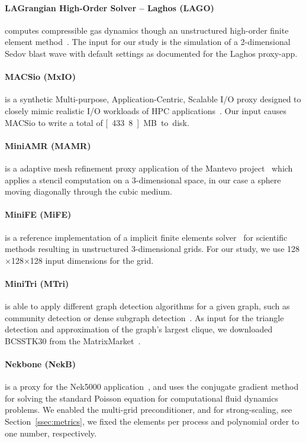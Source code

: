 \paragraph{LAGrangian High-Order Solver -- Laghos (LAGO)} computes compressible gas dynamics though
an unstructured high-order finite element method~\cite{dobrev_high-order_2012}. The input for our study is the
simulation of a 2-dimensional Sedov blast wave with default settings as documented for the
Laghos proxy-app.

\paragraph{MACSio (MxIO)} is a synthetic Multi-purpose, Application-Centric,
Scalable I/O proxy designed to closely mimic realistic I/O workloads of
HPC applications~\cite{dickson_replicating_2016}. Our input causes MACSio to write a total of \unit[433.8]{MB} to disk.

\paragraph{MiniAMR (MAMR)} is a adaptive mesh refinement proxy application of the Mantevo 
project~\cite{heroux_improving_2009} which applies a stencil computation on a 3-dimensional space,
in our case a sphere moving diagonally through the cubic medium.

\paragraph{MiniFE (MiFE)} is a reference implementation of a implicit finite elements 
solver~\cite{heroux_improving_2009} for scientific methods resulting in unstructured 3-dimensional grids.
For our study, we use 128$\times$128$\times$128 input dimensions for the grid.

\paragraph{MiniTri (MTri)} is able to apply different graph detection algorithms for a given graph,
such as community detection or dense subgraph detection~\cite{wolf_task-based_2015}.
As input for the triangle detection and approximation of the graph's largest clique, we downloaded
BCSSTK30 from the MatrixMarket~\cite{boisvert_matrix_1997}.

\paragraph{Nekbone (NekB)} is a proxy for the Nek5000 application~\cite{argonne_national_laboratory_nek5000_nodate}, and uses the conjugate
gradient method for solving the standard Poisson equation for computational fluid dynamics problems.
We enabled the multi-grid preconditioner, and for strong-scaling, see Section~\ref{ssec:metrics},
we fixed the elements per process and polynomial order to one number, respectively.

